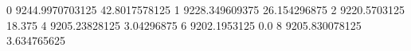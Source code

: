 0 9244.9970703125 42.8017578125
1 9228.349609375 26.154296875
2 9220.5703125 18.375
4 9205.23828125 3.04296875
6 9202.1953125 0.0
8 9205.830078125 3.634765625
